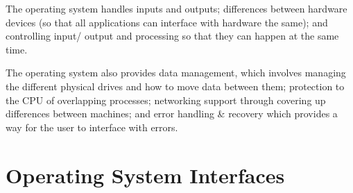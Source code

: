 The operating system handles inputs and outputs; differences between hardware devices (so that all applications can interface with hardware the same); and controlling input/ output and processing so that they can happen at the same time.

The operating system also provides data management, which involves managing the different physical drives and how to move data between them; protection to the CPU of overlapping processes; networking support through covering up differences between machines; and error handling \& recovery which provides a way for the user to interface with errors. 

\section*{Operating System Interfaces}